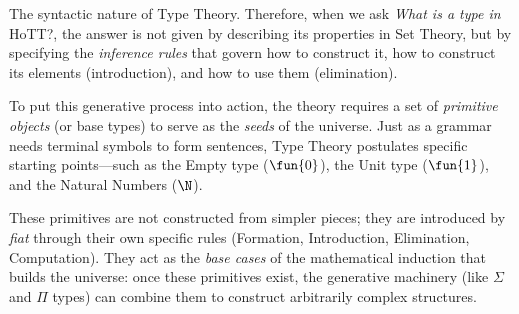 \begin{lpar}{The syntactic nature of Type Theory.}
    Therefore, when we ask \textit{What is a type in} HoTT?, the answer is not given by describing its properties in Set Theory, but by specifying the \textit{inference rules} that govern how to construct it, how to construct its elements (introduction), and how to use them (elimination).

    To put this generative process into action, the theory requires a set of \textsl{primitive objects} (or base types) to serve as the \textit{seeds} of the universe. Just as a grammar needs terminal symbols to form sentences, Type Theory postulates specific starting points—such as the Empty type ($\fun{0}$), the Unit type ($\fun{1}$), and the Natural Numbers ($\N$).
    
    These primitives are not constructed from simpler pieces; they are introduced by \textit{fiat} through their own specific rules (Formation, Introduction, Elimination, Computation). They act as the \textit{base cases} of the mathematical induction that builds the universe: once these primitives exist, the generative machinery (like $\Sigma$ and $\Pi$ types) can combine them to construct arbitrarily complex structures.
\end{lpar}


